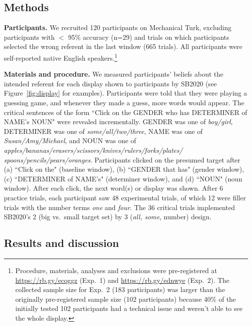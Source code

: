 \documentclass[10pt,letterpaper]{article}
\newcommand{\figref}[1]{Figure~\ref{#1}}
\begin{document}
\subsection{Methods}

\textbf{Participants.} We recruited 120 participants on Mechanical Turk, excluding participants with $<$ 95\% accuracy (n=29) and trials on which participants selected the wrong referent in the last window (665 trials). All participants were self-reported native English speakers.\footnote{Procedure, materials, analyses and exclusions were pre-registered at \url{https://rb.gy/ecoggz} (Exp.~1) and \url{https://rb.gy/ednwye} (Exp.~2). The collected sample size for Exp.~2 (183 participants) was larger than the originally pre-registered sample size (102 participants) because 40\% of the initially tested 102 participants had a technical issue and weren't able to see the whole display.}

\textbf{Materials and procedure.} We measured participants' beliefs about the intended referent for each display shown to participants by SB2020 (see \figref{fig:display} for examples). Participants were told that they were playing a guessing game, and whenever they made a guess, more words would appear. The critical sentences of the form ``Click on the GENDER who has DETERMINER  of NAME's NOUN" were revealed incrementally. GENDER was one of \emph{boy/girl}, DETERMINER was one of \emph{some/all/two/three}, NAME was one of \emph{Susan/Amy/Michael}, and NOUN was one of \emph{apples/bananas/erasers/scissors/knives/rulers/forks/plates/
spoons/pencils/pears/oranges}.  Participants clicked on the presumed target after (a) ``Click on the" (baseline window), (b) ``GENDER that has" (gender window), (c) ``DETERMINER of NAME's" (determiner window), and (d) ``NOUN" (noun window). After each click, the next word(s) or display was shown. After 6 practice trials, each participant saw 48 experimental trials, of which 12 were filler trials with the number terms \emph{one} and \emph{four}. The 36 critical trials implemented SB2020's 2 (big vs.~small target set) by 3 (\emph{all, some}, number) design. 


\subsection{Results and discussion}

\end{document}
